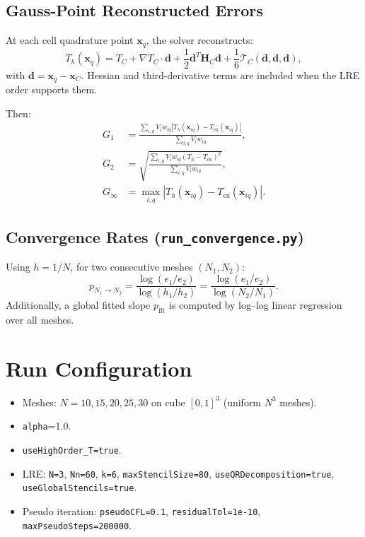 \documentclass[11pt,a4paper]{article}
\begin{document}
\subsection{Gauss-Point Reconstructed Errors}
At each cell quadrature point $\mathbf{x}_q$, the solver reconstructs:
\begin{equation}
T_h(\mathbf{x}_q)=T_C+\nabla T_C\cdot\mathbf{d}+\frac{1}{2}\mathbf{d}^T\mathbf{H}_C\mathbf{d}+\frac{1}{6}\mathcal{T}_C(\mathbf{d},\mathbf{d},\mathbf{d}),
\end{equation}
with $\mathbf{d}=\mathbf{x}_q-\mathbf{x}_C$. Hessian and third-derivative terms are included when the LRE order supports them.

Then:
\begin{align}
G_1 &= \frac{\sum_{i,q}V_i w_{iq}|T_h(\mathbf{x}_{iq})-T_{\mathrm{ex}}(\mathbf{x}_{iq})|}{\sum_{i,q}V_i w_{iq}}, \\
G_2 &= \sqrt{\frac{\sum_{i,q}V_i w_{iq}(T_h-T_{\mathrm{ex}})^2}{\sum_{i,q}V_i w_{iq}}}, \\
G_\infty &= \max_{i,q}|T_h(\mathbf{x}_{iq})-T_{\mathrm{ex}}(\mathbf{x}_{iq})|.
\end{align}

\subsection{Convergence Rates (\texttt{run\_convergence.py})}
Using $h=1/N$, for two consecutive meshes $(N_1,N_2)$:
\begin{equation}
p_{N_1\to N_2}=\frac{\log(e_1/e_2)}{\log(h_1/h_2)}=\frac{\log(e_1/e_2)}{\log(N_2/N_1)}.
\end{equation}
Additionally, a global fitted slope $p_{\mathrm{fit}}$ is computed by log--log linear regression over all meshes.

\section{Run Configuration}
\begin{itemize}
\item Meshes: $N=10,15,20,25,30$ on cube $[0,1]^3$ (uniform $N^3$ meshes).
\item \texttt{alpha}=1.0.
\item \texttt{useHighOrder\_T=true}.
\item LRE: \texttt{N=3}, \texttt{Nn=60}, \texttt{k=6}, \texttt{maxStencilSize=80}, \texttt{useQRDecomposition=true}, \texttt{useGlobalStencils=true}.
\item Pseudo iteration: \texttt{pseudoCFL=0.1}, \texttt{residualTol=1e-10}, \texttt{maxPseudoSteps=200000}.
\end{itemize}
\end{document}
